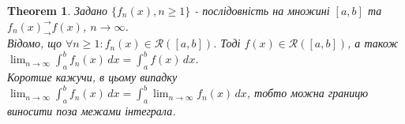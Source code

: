 \documentclass[a4paper, 10pt]{article}
\makeatletter
\def\huge{\displaystyle}
\def\qed{$\blacksquare$}
\theoremstyle{theoremdd}
\newtheorem{theorem}{Theorem}[subsection]
\theoremstyle{theoremdd}
\theoremstyle{theoremdd}
\theoremstyle{theoremdd}
\theoremstyle{theoremdd}
\theoremstyle{theoremdd}
\theoremstyle{theoremdd}
\theoremstyle{theoremdd}
\theoremstyle{theoremdd}
\renewenvironment{proof}[1][Proof.\\]{\par
\pushQED{\hfill \qed}%
\normalfont \topsep6\p@\@plus6\p@\relax
\trivlist
\item\relax
{\bfseries
#1\@addpunct{.}}\hspace\labelsep\ignorespaces
}{%
\popQED\endtrivlist\@endpefalse
}
\makeatother
\begin{document}
\iffalse
\begin{proof}
Зафіксуємо т. $x_0 \in A$. За умовою, $||f_n-f|| \to 0, n \to \infty$.\\
$\implies \forall \varepsilon > 0: \exists N: \forall n \geq N: \forall x \in A: |f_n(x)-f(x)| < \dfrac{\varepsilon}{3} \implies |f_N(x) - f(x)| < \dfrac{\varepsilon}{3}$.\\
$f_N(x) \in C(A) \implies \exists \delta(\varepsilon) > 0: \forall x \in A: |x - x_0| < \delta \Rightarrow |f_N(x) - f_N(x_0)| < \dfrac{\varepsilon}{3}$.\\
$\implies |f(x) - f(x_0)| = |(f(x)-f_N(x)) + (f_N(x)-f_N(x_0)) + (f_N(x_0)-f(x_0))| \leq \\ \leq |f(x)-f_N(x)| + |f_N(x) - f_N(x_0)| + |f_N(x_0) - f(x_0)| < \dfrac{\varepsilon}{3} + \dfrac{\varepsilon}{3} + \dfrac{\varepsilon}{3} = \varepsilon$.\\
$\implies f(x)$ - неперервна в т. $x_0$, яка є довільною. Отже, $f(x) \in C(A)$.\\
$\huge\lim_{n \to \infty} f_n(x_0) = f(x_0) = \lim_{x \to x_0} f(x)$.
\end{proof}
\fi

\begin{theorem}
Задано $\{f_n(x), n \geq 1\}$ - послідовність на множині $[a,b]$ та $f_n(x)^\rightarrow_\rightarrow f(x)$, $n \to \infty$.\\
Відомо, що $\forall n \geq 1: f_n(x) \in \mathcal{R}([a,b])$. Тоді $f(x) \in \mathcal{R}([a,b])$, а також $\huge\lim_{n \to \infty} \int_a^b f_n(x)\,dx = \int_a^b f(x)\,dx$.\\
Коротше кажучи, в цьому випадку $\displaystyle\lim_{n \to \infty} \int_a^b f_n(x)\,dx = \int_a^b \lim_{n \to \infty} f_n(x)\,dx$, тобто можна границю виносити поза межами інтеграла.
\end{theorem}
\end{document}
